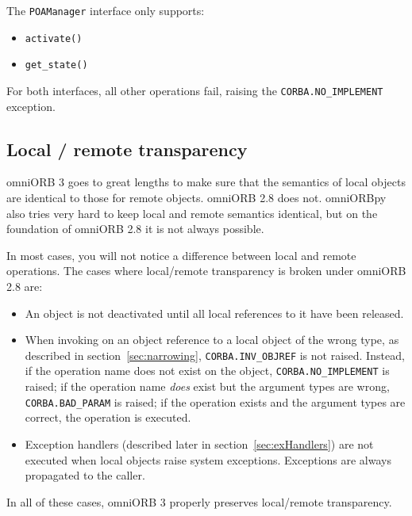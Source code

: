\documentclass[11pt,twoside,a4paper]{book}
\newcommand{\intf}[1]{\texttt{#1}}
\newcommand{\code}[1]{\texttt{#1}}
\newcommand{\op}[1]{\texttt{#1()}}
\newenvironment{nsitemize}%
 {\begin{itemize}\setlength{\itemsep}{0pt}}%
 {\end{itemize}}
\begin{document}
\noindent The \intf{POAManager} interface only supports:

\begin{nsitemize}
\item \op{activate}
\item \op{get\_state}
\end{nsitemize}

\noindent For both interfaces, all other operations fail, raising the
\code{CORBA.NO\_IMPLEMENT} exception.



\subsection{Local / remote transparency}

omniORB 3 goes to great lengths to make sure that the semantics of
local objects are identical to those for remote objects. omniORB 2.8
does not. omniORBpy also tries very hard to keep local and remote
semantics identical, but on the foundation of omniORB 2.8 it is not
always possible.

In most cases, you will not notice a difference between local and
remote operations. The cases where local/remote transparency is broken
under omniORB 2.8 are:

\begin{itemize}

\item An object is not deactivated until all local references to it
have been released.

\item When invoking on an object reference to a local object of the
wrong type, as described in section~\ref{sec:narrowing},
\code{CORBA.INV\_OBJREF} is not raised. Instead, if the operation name
does not exist on the object, \code{CORBA.NO\_IMPLEMENT} is raised; if
the operation name \emph{does} exist but the argument types are wrong,
\code{CORBA.BAD\_PARAM} is raised; if the operation exists and the
argument types are correct, the operation is executed.

\item Exception handlers (described later in
section~\ref{sec:exHandlers}) are not executed when local objects
raise system exceptions. Exceptions are always propagated to the
caller.

\end{itemize}

In all of these cases, omniORB 3 properly preserves local/remote
transparency.
\end{document}
